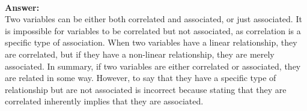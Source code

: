\documentclass[12pt]{article}
\begin{document}
\begin{enumerate}
 \\ 
\textbf{Answer: } \\ 

Two variables can be either both correlated and associated, or just associated. It is impossible for variables to be correlated but not associated, as correlation is a specific type of association. When two variables have a linear relationship, they are correlated, but if they have a non-linear relationship, they are merely associated. In summary, if two variables are either correlated or associated, they are related in some way. However, to say that they have a specific type of relationship but are not associated is incorrect because stating that they are correlated inherently implies that they are associated. \\ 

\end{enumerate}

\newpage 
{}
\end{document}
